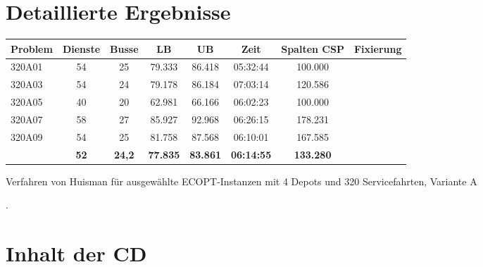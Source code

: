 \appendix

\chapter{Detaillierte Ergebnisse} \label{tables}


\begin{ergebnisse} \centering	
\begin{tabular}{lccccccc}

{\bf Problem} & {\bf Dienste} & {\bf Busse} &   {\bf LB} &   {\bf UB} & {\bf Zeit} & {\bf Spalten CSP} & {\bf Fixierung} \\
\hline
    320A01 &         54 &         25 &     79.333 &     86.418 &   05:32:44 &    100.000 &            \\

    320A03 &         54 &         24 &     79.178 &     86.184 &   07:03:14 &    120.586 &            \\

    320A05 &         40 &         20 &     62.981 &     66.166 &   06:02:23 &    100.000 &            \\

    320A07 &         58 &         27 &     85.927 &     92.968 &   06:26:15 &    178.231 &            \\

    320A09 &         54 &         25 &     81.758 &     87.568 &   06:10:01 &    167.585 &            \\
\hline
           &   {\bf 52} & {\bf 24,2} & {\bf 77.835} & {\bf 83.861} & {\bf 06:14:55} & {\bf 133.280} &     {\bf } \\

\end{tabular}  
\caption{Verfahren von Huisman für ausgewählte ECOPT-Instanzen mit 4 Depots und 320 Servicefahrten, Variante A}.
\end{ergebnisse}

\chapter{Inhalt der CD}

